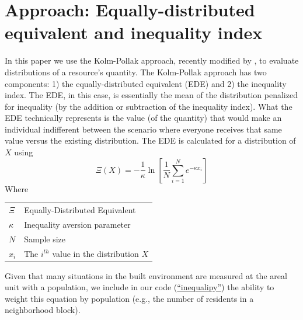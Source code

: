 \documentclass[final,3p,times,onecolumn,sort&compress]{elsarticle}
\makeatletter
\newenvironment{conditions}
  {\par\vspace{\abovedisplayskip}\noindent\begin{tabular}{>{$}l<{$} @{${}={}$} l}}
  {\end{tabular}\par\vspace{\belowdisplayskip}}
\makeatother
\begin{document}
\section{Approach: Equally-distributed equivalent and inequality index}
\label{sec:method}
In this paper we use the Kolm-Pollak approach, recently modified by \cite{Sheriff2020-ge}, to evaluate distributions of a resource's quantity.
The Kolm-Pollak approach has two components: 1) the equally-distributed equivalent (EDE) and 2) the inequality index.
The EDE, in this case, is essentially the mean of the distribution penalized for inequality (by the addition or subtraction of the inequality index).
What the EDE technically represents is the value (of the quantity) that would make an individual indifferent between the scenario where everyone receives that same value versus the existing distribution.
The EDE is calculated for a distribution of $X$ using \citep{Sheriff2020-ge}
\begin{equation}
    \Xi (X) = -\frac{1}{\kappa} \ln \left[ \frac{1}{N} \sum_{i=1}^{N} e ^ {-\kappa x_i} \right]
\end{equation}
Where
\begin{conditions}
     \Xi  & Equally-Distributed Equivalent\\
     \kappa &  Inequality aversion parameter\\   
     N & Sample size \\   
     x_i & The $i^{th}$ value in the distribution $X$ \\
\end{conditions}
Given that many situations in the built environment are measured at the areal unit with a population, we include in our code (\href{https://pypi.org/project/inequalipy/}{``inequalipy''}) the ability to weight this equation by population (e.g., the number of residents in a neighborhood block).
\end{document}
